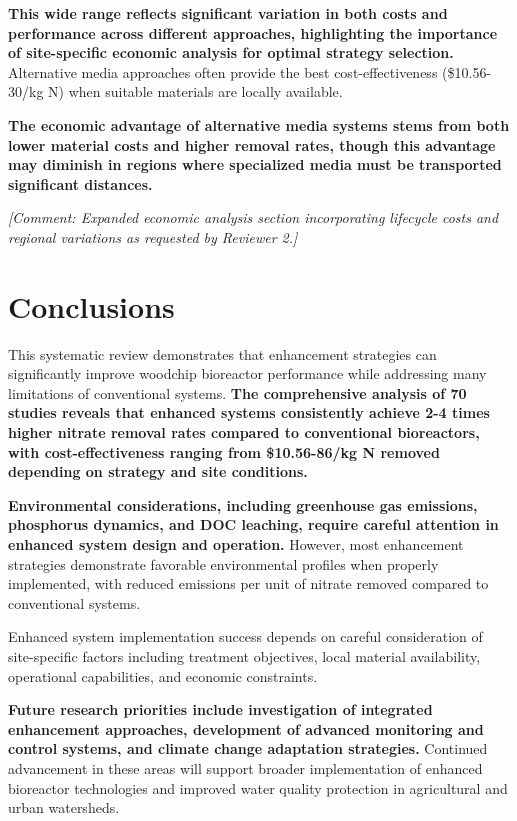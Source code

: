 \documentclass[12pt,a4paper]{article}
\newcommand{\added}[1]{\textcolor{addedtext}{\textbf{#1}}}
\newcommand{\comment}[1]{\textcolor{commenttext}{\textit{[Comment: #1]}}}
\begin{document}
\added{This wide range reflects significant variation in both costs and performance across different approaches, highlighting the importance of site-specific economic analysis for optimal strategy selection.} Alternative media approaches often provide the best cost-effectiveness (\$10.56-30/kg N) when suitable materials are locally available.

\added{The economic advantage of alternative media systems stems from both lower material costs and higher removal rates, though this advantage may diminish in regions where specialized media must be transported significant distances.}

\comment{Expanded economic analysis section incorporating lifecycle costs and regional variations as requested by Reviewer 2.}

\section{Conclusions}

This systematic review demonstrates that enhancement strategies can significantly improve woodchip bioreactor performance while addressing many limitations of conventional systems. \added{The comprehensive analysis of 70 studies reveals that enhanced systems consistently achieve 2-4 times higher nitrate removal rates compared to conventional bioreactors, with cost-effectiveness ranging from \$10.56-86/kg N removed depending on strategy and site conditions.}

\added{Environmental considerations, including greenhouse gas emissions, phosphorus dynamics, and DOC leaching, require careful attention in enhanced system design and operation.} However, most enhancement strategies demonstrate favorable environmental profiles when properly implemented, with reduced emissions per unit of nitrate removed compared to conventional systems.

Enhanced system implementation success depends on careful consideration of site-specific factors including treatment objectives, local material availability, operational capabilities, and economic constraints.

\added{Future research priorities include investigation of integrated enhancement approaches, development of advanced monitoring and control systems, and climate change adaptation strategies.} Continued advancement in these areas will support broader implementation of enhanced bioreactor technologies and improved water quality protection in agricultural and urban watersheds.
\end{document}

